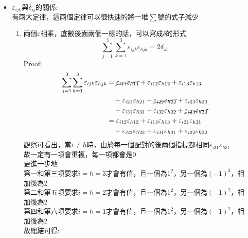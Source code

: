 \documentclass[../main.tex]{subfiles}
\begin{document}
\begin{itemize}
\begin{itemize}
\begin{enumerate}
\begin{equation}
{          }
        \end{equation}
      \end{enumerate}
      \item $\varepsilon_{ijk}$與$\delta_{ij}$的關係:\\
        有兩大定律，這兩個定律可以很快速的將一堆$\sum$號的式子減少
        \begin{enumerate}
          \item 兩個$\varepsilon$相乘，底數後面兩個一樣的話，可以寫成$\delta$的形式
            \begin{equation}
              \sum_{j=1}^3\sum_{k=1}^3 \varepsilon_{ijk}\varepsilon_{hjk} = 2\delta_{ih} \label{eq:epsilon_delta_relation}
            \end{equation}
            Proof:
            \begin{align}
              \sum_{j=1}^3\sum_{k=1}^3 \varepsilon_{ijk}\varepsilon_{hjk} &= 
              \cancel{\varepsilon_{i11}\varepsilon_{h11}} + \varepsilon_{i12}\varepsilon_{h12} + \varepsilon_{i13}\varepsilon_{h13} \nonumber \\
              &\quad + \varepsilon_{i21}\varepsilon_{h21} + \cancel{\varepsilon_{i22}\varepsilon_{h22}} + \varepsilon_{i23}\varepsilon_{h23} \nonumber \\
              &\quad + \varepsilon_{i31}\varepsilon_{h31} + \varepsilon_{i32}\varepsilon_{h32} + \cancel{\varepsilon_{i33}\varepsilon_{h33}} \nonumber \\
              &= \varepsilon_{i12}\varepsilon_{h12} + \varepsilon_{i13}\varepsilon_{h13} + \varepsilon_{i21}\varepsilon_{h21} \nonumber \\
              &\quad + \varepsilon_{i23}\varepsilon_{h23} + \varepsilon_{i31}\varepsilon_{h31} + \varepsilon_{i32}\varepsilon_{h32}
            \end{align}
            觀察可看出，當$i\neq h$時，由於每一個配對的後兩個指標都相同$\varepsilon_{i31}\varepsilon_{h31}$\\
            故一定有一項會重複，每一項都會是0\\
            更進一步地\\
            第一和第三項要求$i=h=3$才會有值，且一個為$1^2$，另一個為$(-1)^2$，相加後為2\\
            第二和第五項要求$i=h=2$才會有值，且一個為$1^2$，另一個為$(-1)^2$，相加後為2\\
            第四和第六項要求$i=h=1$才會有值，且一個為$1^2$，另一個為$(-1)^2$，相加後為2\\
            故總結可得:

\end{enumerate}
\end{itemize}
\end{itemize}
\end{document}
